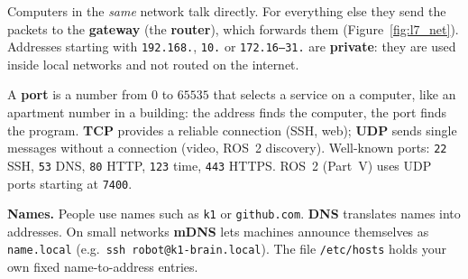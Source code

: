 Computers in the \emph{same} network talk directly. For everything else they send the packets to the \textbf{gateway} (the \textbf{router}), which forwards them (Figure~\ref{fig:l7_net}). Addresses starting with \texttt{192.168.}, \texttt{10.} or \texttt{172.16--31.} are \textbf{private}: they are used inside local networks and not routed on the internet.

\begin{center}
\label{fig:l7_net}
\end{center}

A \textbf{port} is a number from $0$ to $65535$ that selects a service on a computer, like an apartment number in a building: the address finds the computer, the port finds the program. \textbf{TCP} provides a reliable connection (SSH, web); \textbf{UDP} sends single messages without a connection (video, ROS~2 discovery). Well-known ports: \texttt{22} SSH, \texttt{53} DNS, \texttt{80} HTTP, \texttt{123} time, \texttt{443} HTTPS. ROS~2 (Part~V) uses UDP ports starting at \texttt{7400}.

\textbf{Names.} People use names such as \texttt{k1} or \texttt{github.com}. \textbf{DNS} translates names into addresses. On small networks \textbf{mDNS} lets machines announce themselves as \texttt{name.local} (e.g.\ \texttt{ssh robot@k1-brain.local}). The file \texttt{/etc/hosts} holds your own fixed name-to-address entries.


